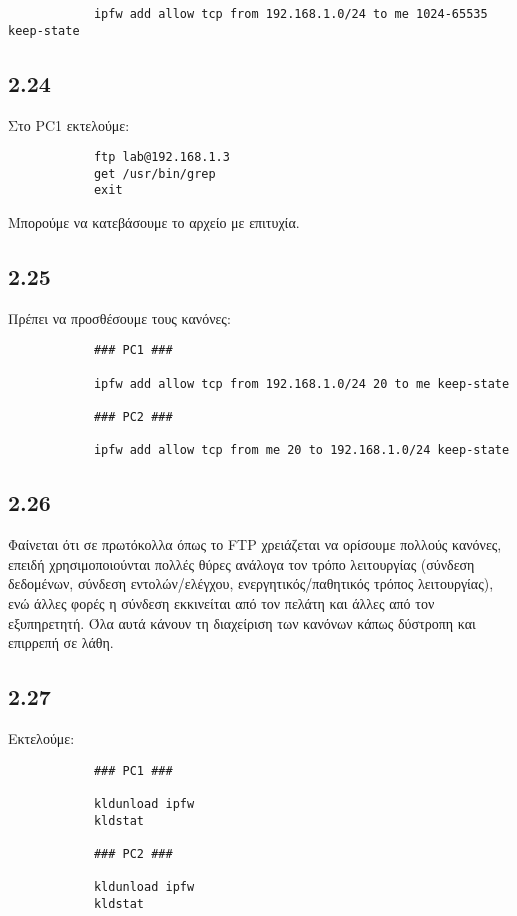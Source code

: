 \documentclass[a4paper, 12pt]{article}
\begin{document}
		\begin{verbatim}
			ipfw add allow tcp from 192.168.1.0/24 to me 1024-65535 keep-state
		\end{verbatim}

	\subsection*{2.24}
		Στο PC1 εκτελούμε:
		
		\begin{verbatim}
			ftp lab@192.168.1.3
			get /usr/bin/grep
			exit
		\end{verbatim}

		Μπορούμε να κατεβάσουμε το αρχείο με επιτυχία. 

	\subsection*{2.25}
		Πρέπει να προσθέσουμε τους κανόνες:
		
		\begin{verbatim}
			### PC1 ###
			
			ipfw add allow tcp from 192.168.1.0/24 20 to me keep-state
			
			### PC2 ###
			
			ipfw add allow tcp from me 20 to 192.168.1.0/24 keep-state
		\end{verbatim}

	\subsection*{2.26}
		Φαίνεται ότι σε πρωτόκολλα όπως το FTP χρειάζεται να ορίσουμε πολλούς κανόνες, επειδή χρησιμοποιούνται πολλές θύρες ανάλογα τον τρόπο λειτουργίας (σύνδεση δεδομένων, σύνδεση εντολών/ελέγχου, ενεργητικός/παθητικός τρόπος λειτουργίας), ενώ άλλες φορές η σύνδεση εκκινείται από τον πελάτη και άλλες από τον εξυπηρετητή. Όλα αυτά κάνουν τη διαχείριση των κανόνων κάπως δύστροπη και επιρρεπή σε λάθη.

	\subsection*{2.27}
		Εκτελούμε:
		
		\begin{verbatim}
			### PC1 ###
			
			kldunload ipfw
			kldstat 
			
			### PC2 ###
			
			kldunload ipfw
			kldstat
		\end{verbatim}
		
\end{document}
